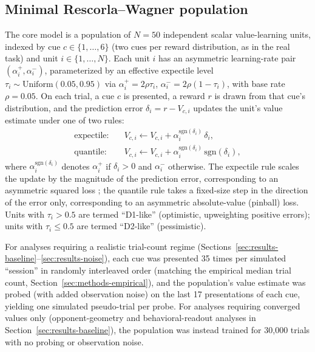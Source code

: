 \documentclass[11pt]{article}
\begin{document}
\subsection{Minimal Rescorla--Wagner population}
\label{sec:methods-rw-population}

The core model is a population of $N=50$ independent scalar value-learning units, indexed by cue $c \in \{1,\dots,6\}$ (two cues per reward distribution, as in the real task) and unit $i \in \{1,\dots,N\}$. Each unit $i$ has an asymmetric learning-rate pair $(\alpha_i^+, \alpha_i^-)$, parameterized by an effective expectile level $\tau_i \sim \mathrm{Uniform}(0.05, 0.95)$ via $\alpha_i^+ = 2 \rho \tau_i$, $\alpha_i^- = 2\rho(1-\tau_i)$, with base rate $\rho = 0.05$. On each trial, a cue $c$ is presented, a reward $r$ is drawn from that cue's distribution, and the prediction error $\delta_i = r - V_{c,i}$ updates the unit's value estimate under one of two rules:
\begin{align}
    \text{expectile:} \quad & V_{c,i} \leftarrow V_{c,i} + \alpha_i^{\mathrm{sgn}(\delta_i)} \, \delta_i, \\
    \text{quantile:} \quad & V_{c,i} \leftarrow V_{c,i} + \alpha_i^{\mathrm{sgn}(\delta_i)} \, \mathrm{sgn}(\delta_i),
\end{align}
where $\alpha_i^{\mathrm{sgn}(\delta_i)}$ denotes $\alpha_i^+$ if $\delta_i > 0$ and $\alpha_i^-$ otherwise. The expectile rule scales the update by the magnitude of the prediction error, corresponding to an asymmetric squared loss \citep{newey1987,rowland2019}; the quantile rule takes a fixed-size step in the direction of the error only, corresponding to an asymmetric absolute-value (pinball) loss. Units with $\tau_i > 0.5$ are termed ``D1-like'' (optimistic, upweighting positive errors); units with $\tau_i \le 0.5$ are termed ``D2-like'' (pessimistic).

For analyses requiring a realistic trial-count regime (Sections~\ref{sec:results-baseline}--\ref{sec:results-noise}), each cue was presented 35 times per simulated ``session'' in randomly interleaved order (matching the empirical median trial count, Section~\ref{sec:methods-empirical}), and the population's value estimate was probed (with added observation noise) on the last 17 presentations of each cue, yielding one simulated pseudo-trial per probe. For analyses requiring converged values only (opponent-geometry and behavioral-readout analyses in Section~\ref{sec:results-baseline}), the population was instead trained for 30{,}000 trials with no probing or observation noise.
\end{document}
